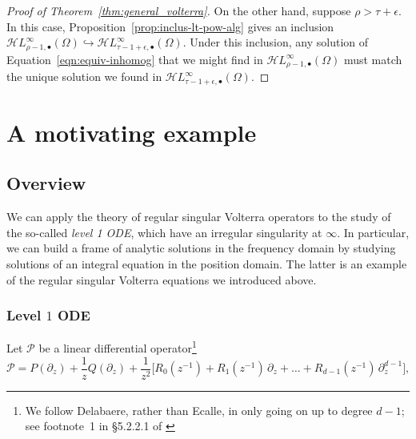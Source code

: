 \documentclass{article}
\theoremstyle{plain}
\newcommand{\singexp}[2]{\mathcal{H}L^\infty_{#1, #2}}
\newcommand{\singexpalg}[1]{\singexp{#1}{\bullet}}
\newcommand{\softpart}{\mathcal{V}_\star}
\newcommand{\solproto}{f_0}
\begin{document}
\begin{proof}[Proof of Theorem~\ref{thm:general_volterra}]
On the other hand, suppose $\rho > \tau+\epsilon$. In this case, Proposition~\ref{prop:inclus-lt-pow-alg} gives an inclusion $\singexpalg{\rho-1}(\Omega) \hookrightarrow \singexpalg{\tau-1+\epsilon}(\Omega)$. Under this inclusion, any solution of Equation~\eqref{eqn:equiv-inhomog} that we might find in $\singexpalg{\rho-1}(\Omega)$ must match the unique solution we found in $\singexpalg{\tau-1+\epsilon}(\Omega)$.


\end{proof}


\section{A motivating example}\label{sec:example}
\subsection{Overview}

We can apply the theory of regular singular Volterra operators to the study of the so-called \textit{level 1 ODE}, which have an irregular singularity at $\infty$. In particular, we can build a frame of analytic solutions in the frequency domain by studying solutions of an integral equation in the position domain. The latter is an example of the regular singular Volterra equations we introduced above.    

\subsubsection{Level $1$ ODE}\label{sec:level 1 ODE}

Let $\mathcal{P}$ be a linear differential operator\footnote{ We follow Delabaere, rather than Ecalle, in only going on up to degree $d-1$; see footnote~1 in \S 5.2.2.1 of \cite{diverg-resurg-iii}}
\begin{equation}\label{eqn:level 1 ode}
\mathcal{P} = P(\partial_z) + \frac{1}{z} Q(\partial_z) + \frac{1}{z^2}\big[ R_0(z^{-1}) + R_1(z^{-1})\,\partial_z + \ldots + R_{d-1}(z^{-1})\,\partial_z^{d-1} \big],
\end{equation}
\end{document}
